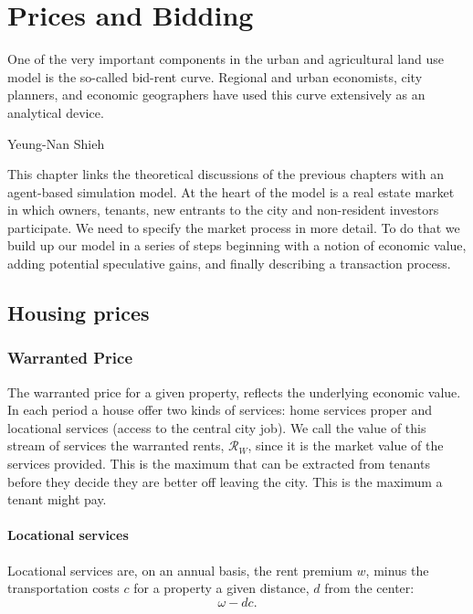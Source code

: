 \chapter[Bidding]{Prices and Bidding}
\label{appendix-bid-price}
\epigraph{One of the very important components in the urban and agricultural land use model is the so-called \gls{bid-rent curve}. Regional and urban economists, city planners, and economic geographers have used this curve extensively as an analytical device.}{Yeung-Nan Shieh\cite{shiehWilhelmLaunhardtBidRent2004}}

This chapter links the theoretical discussions of the previous chapters with an agent-based simulation model. At the heart of the model is a real estate market in which owners, tenants, new entrants to the city and non-resident investors participate. We need to specify the market process in more detail. To do that we build up our model in a series of steps beginning with a notion of economic value, adding potential speculative gains, and finally describing a transaction process. 

\section{Housing prices} \label{section-housing-price}


\subsection{Warranted Price}

The warranted price for a given property, reflects the underlying economic value. In each period a house offer two kinds of services: home services proper and locational services (access to the central city job). We call the value of this stream of services the \glspl{warranted rent}, $\mathcal{R}_W$, since it is the market value of the services provided. This is the maximum that can be extracted from tenants before they decide they are better off leaving the city. This is the maximum a tenant might pay. %

\subsubsection{Locational services}

Locational services are, on an annual basis, the rent premium $w$, minus the transportation costs $c$ for a property a given distance, $d$ from the center:
\[\omega- {dc}.\]

